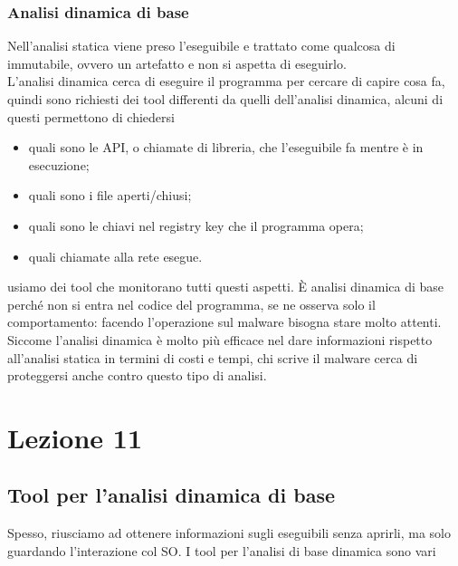 \documentclass[12pt, oneside]{extbook}
\begin{document}
\subsection{Analisi dinamica di base}
Nell'analisi statica viene preso l'eseguibile e trattato come qualcosa di immutabile, ovvero un artefatto e non si aspetta di eseguirlo. \\ L'analisi dinamica cerca di eseguire il programma per cercare di capire cosa fa, quindi sono richiesti dei tool differenti da quelli dell'analisi dinamica, alcuni di questi permettono di chiedersi 
\begin{itemize}
\item quali sono le API, o chiamate di libreria, che l'eseguibile fa mentre è in esecuzione;
\item quali sono i file aperti/chiusi;
\item quali sono le chiavi nel registry key che il programma opera;
\item quali chiamate alla rete esegue.
\end{itemize}
usiamo dei tool che monitorano tutti questi aspetti. È analisi dinamica di base perché non si entra nel codice del programma, se ne osserva solo il comportamento: facendo l'operazione sul malware bisogna stare molto attenti. Siccome l'analisi dinamica è molto più efficace nel dare informazioni rispetto all'analisi statica in termini di costi e tempi, chi scrive il malware cerca di proteggersi anche contro questo tipo di analisi.
\chapter{Lezione 11}
\section{Tool per l'analisi dinamica di base}
Spesso, riusciamo ad ottenere informazioni sugli eseguibili senza aprirli, ma solo guardando l'interazione col SO. I tool per l'analisi di base dinamica sono vari
\end{document}
